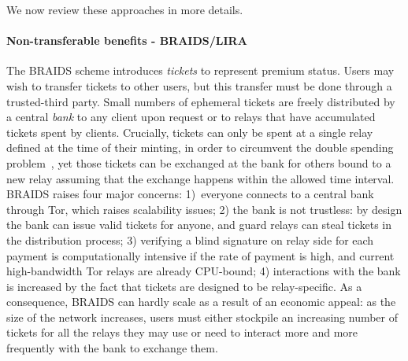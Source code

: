 

We now review these approaches in more details.

\paragraph*{Non-transferable benefits - BRAIDS/LIRA} The BRAIDS scheme
introduces \emph{tickets} to represent premium status. Users may wish to
transfer tickets to other users, but this transfer must be done through a
trusted-third party. Small numbers of ephemeral tickets are freely distributed
by a central \emph{bank} to any client upon request or to relays that have
accumulated tickets spent by clients. Crucially, tickets can only be spent at a
single relay defined at the time of their minting, in order to circumvent the
double spending problem~\cite{jansen2010recruiting}, yet those tickets can be
exchanged at the bank for others bound to a new relay assuming that the exchange
happens within the allowed time interval. BRAIDS raises four major concerns:
1)~everyone connects to a central bank through Tor, which raises scalability
issues; 2) the bank is not trustless: by design the bank can issue valid tickets
for anyone, and guard relays can steal tickets in the distribution process; 3)
verifying a blind signature on relay side for each payment is computationally
intensive if the rate of payment is high, and current high-bandwidth Tor relays
are already CPU-bound; 4) interactions with the bank is increased by the fact
that tickets are designed to be relay-specific. As a consequence, BRAIDS can
hardly scale as a result of an economic appeal: as the size of the network
increases, users must either stockpile an increasing number of tickets for all
the relays they may use or need to interact more and more frequently with the
bank to exchange them.

